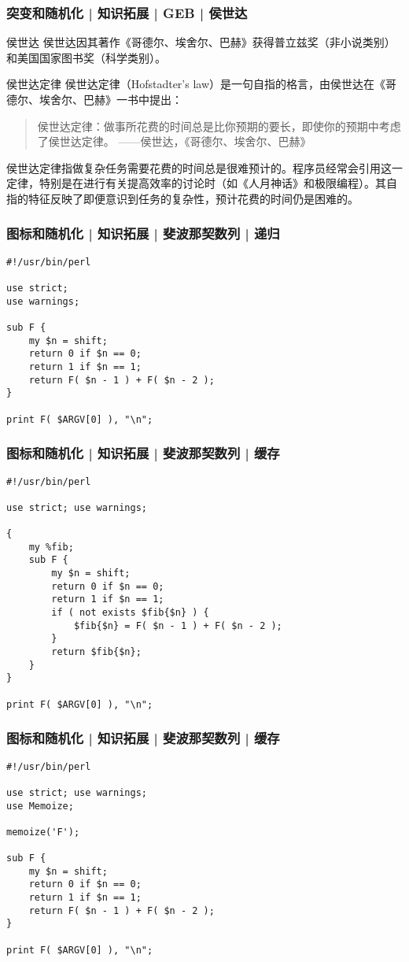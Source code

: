 \begin{frame}
  \frametitle{突变和随机化 | 知识拓展 | GEB | 侯世达}
  \begin{block}{侯世达}
    侯世达因其著作《哥德尔、埃舍尔、巴赫》获得普立兹奖（非小说类别）和美国国家图书奖（科学类别）。
  \end{block}
  \begin{block}{侯世达定律}
    侯世达定律（Hofstadter's law）是一句自指的格言，由侯世达在《哥德尔、埃舍尔、巴赫》一书中提出：
    \begin{quote}
    侯世达定律：做事所花费的时间总是比你预期的要长，即使你的预期中考虑了侯世达定律。 ——侯世达，《哥德尔、埃舍尔、巴赫》
    \end{quote}
侯世达定律指做复杂任务需要花费的时间总是很难预计的。程序员经常会引用这一定律，特别是在进行有关提高效率的讨论时（如《人月神话》和极限编程）。其自指的特征反映了即便意识到任务的复杂性，预计花费的时间仍是困难的。
  \end{block}
\end{frame}

\begin{frame}[fragile]
  \frametitle{图标和随机化 | 知识拓展 | 斐波那契数列 | 递归}
\begin{lstlisting}
#!/usr/bin/perl

use strict;
use warnings;

sub F {
    my $n = shift;
    return 0 if $n == 0;
    return 1 if $n == 1;
    return F( $n - 1 ) + F( $n - 2 );
}

print F( $ARGV[0] ), "\n";
\end{lstlisting}
\end{frame}

\begin{frame}[fragile]
  \frametitle{图标和随机化 | 知识拓展 | 斐波那契数列 | 缓存}
\begin{lstlisting}[basicstyle=\small\tt]
#!/usr/bin/perl

use strict; use warnings;

{
    my %fib;
    sub F {
        my $n = shift;
        return 0 if $n == 0;
        return 1 if $n == 1;
        if ( not exists $fib{$n} ) {
            $fib{$n} = F( $n - 1 ) + F( $n - 2 );
        }
        return $fib{$n};
    }
}

print F( $ARGV[0] ), "\n";
\end{lstlisting}
\end{frame}

\begin{frame}[fragile]
  \frametitle{图标和随机化 | 知识拓展 | 斐波那契数列 | 缓存}
\begin{lstlisting}
#!/usr/bin/perl

use strict; use warnings;
use Memoize;

memoize('F');

sub F {
    my $n = shift;
    return 0 if $n == 0;
    return 1 if $n == 1;
    return F( $n - 1 ) + F( $n - 2 );
}

print F( $ARGV[0] ), "\n";
\end{lstlisting}
\end{frame}


